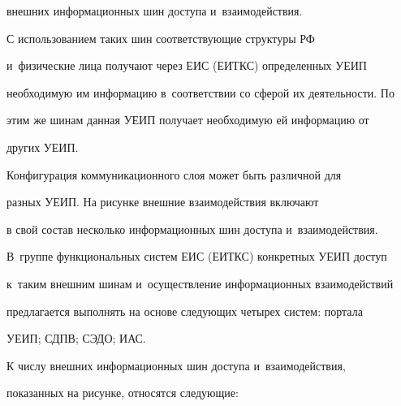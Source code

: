 внешних информационных шин доступа и~взаимодействия.

     

     С использованием таких шин соответствующие структуры РФ 

и~физические лица получают через ЕИС (ЕИТКС) определенных УЕИП 

необходимую им информацию в~соответствии со сферой их деятельности. По 

этим же шинам данная УЕИП получает необходимую ей информацию от 

других УЕИП.

     

     Конфигурация коммуникационного слоя может быть различной для 

разных УЕИП. На рисунке внешние взаимодействия включают 

в свой состав несколько информационных шин доступа и~взаимодействия. 

В~группе функциональных систем ЕИС (ЕИТКС) конкретных УЕИП доступ 

к~таким внешним шинам и~осуществление информационных взаимодействий 

предлагается выполнять на основе следующих четырех систем: портала 

УЕИП; СДПВ; СЭДО;   ИАС.

     

     К числу внешних информационных шин доступа и~взаимодействия, 

показанных на рисунке, относятся следующие:

